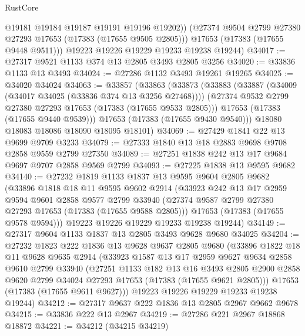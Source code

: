\begin{lexlean}{RustCore}
\begin{coremodule}
            @19181
            @19184
            @19187
            @19191
            @19196
            @19202))
        (@27374 @9504 @2799 @27380 @27293 @17653 (@17383 (@17655 @9505 @2805)))
        @17653
        (@17383 (@17655 @9448 @9511)))
      @19223
      @19226
      @19229
      @19233
      @19238
      @19244)
@34017 := @27317 @9521 @1133 @374 @13 @2805 @3493 @2805 @3256
@34020 := @33836 @1133 @13 @3493
@34024 := @27286 @1132 @3493 @19261 @19265
@34025 := @34020 @34024
@34063 := @33857
    (@33863
      (@33873
        (@33883
          (@33887 (@34009 (@34017 @34025 (@33836 @374 @13 @3256 @27468))))
          (@27374 @9532 @2799 @27380 @27293 @17653 (@17383 (@17655 @9533 @2805)))
          @17653
          (@17383 (@17655 @9440 @9539)))
        @17653
        (@17383 (@17655 @9430 @9540)))
      @18080
      @18083
      @18086
      @18090
      @18095
      @18101)
@34069 := @27429 @1841 @22 @13 @9699 @9709 @3233
@34079 := @27333 @1840 @13 @18 @2883 @9698 @9708 @2858 @9559 @2799 @27350
@34089 := @27251 @1838 @242 @13 @17 @9684 @9697 @9707 @2858 @9569 @2799
@34093 := @27225 @1838 @13 @9595 @9682
@34140 := @27232
    @1819
    @1133
    @1837
    @13
    @9595
    @9604
    @2805
    @9682
    (@33896
      @1818
      @18
      @11
      @9595
      @9602
      @2914
      (@33923
        @242
        @13
        @17
        @2959
        @9594
        @9601
        @2858
        @9577
        @2799
        @33940
        (@27374 @9587 @2799 @27380 @27293 @17653 (@17383 (@17655 @9588 @2805)))
        @17653
        (@17383 (@17655 @9578 @9594)))
      @19223
      @19226
      @19229
      @19233
      @19238
      @19244)
@34149 := @27317 @9604 @1133 @1837 @13 @2805 @3493 @9628 @9680 @34025
@34204 := @27232
    @1823
    @222
    @1836
    @13
    @9628
    @9637
    @2805
    @9680
    (@33896
      @1822
      @18
      @11
      @9628
      @9635
      @2914
      (@33923
        @1587
        @13
        @17
        @2959
        @9627
        @9634
        @2858
        @9610
        @2799
        @33940
        (@27251
          @1133
          @182
          @13
          @16
          @3493
          @2805
          @2900
          @2858
          @9620
          @2799
          @34024
          @27293
          @17653
          (@17383 (@17655 @9621 @2805)))
        @17653
        (@17383 (@17655 @9611 @9627)))
      @19223
      @19226
      @19229
      @19233
      @19238
      @19244)
@34212 := @27317 @9637 @222 @1836 @13 @2805 @2967 @9662 @9678
@34215 := @33836 @222 @13 @2967
@34219 := @27286 @221 @2967 @18868 @18872
@34221 := @34212 (@34215 @34219)

\end{coremodule}
\end{lexlean}
